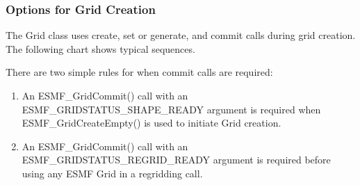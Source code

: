 \subsubsection{Options for Grid Creation}

The Grid class uses create, set or generate, and 
commit calls during grid creation.  The following chart
shows typical sequences.

There are two simple rules for when commit calls are required:
\begin{enumerate}
\item An ESMF\_GridCommit() call with an ESMF\_GRIDSTATUS\_SHAPE\_READY
argument is required when ESMF\_GridCreateEmpty() is used to initiate
Grid creation.
\item An ESMF\_GridCommit() call with an ESMF\_GRIDSTATUS\_REGRID\_READY
argument is required before using any ESMF Grid in a regridding call.
\end{enumerate}

